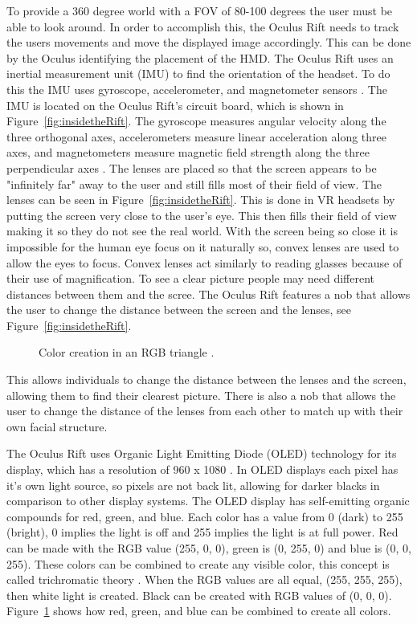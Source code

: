 To provide a 360 degree world with a FOV of 80-100 degrees the user must be able to look around. In order to accomplish this, the Oculus Rift needs to track the users movements and move the displayed image accordingly. This can be done by the Oculus identifying the placement of the HMD. The Oculus Rift uses an inertial measurement unit (IMU) to find the orientation of the headset. To do this the IMU uses gyroscope, accelerometer, and magnetometer sensors \cite{LaValle2017}. The IMU is located on the Oculus Rift's circuit board, which is shown in Figure~\ref{fig:insidetheRift}. The gyroscope measures angular velocity along the three orthogonal axes, accelerometers measure linear acceleration along three axes, and magnetometers measure magnetic field strength along the three perpendicular axes \cite{LaValle2017}. The lenses are placed so that the screen appears to be "infinitely far" away to the user and still fills most of their field of view. The lenses can be seen in Figure~\ref{fig:insidetheRift}. This is done in VR headsets by putting the screen very close to the user's eye. This then fills their field of view making it so they do not see the real world. With the screen being so close it is impossible for the human eye focus on it naturally so, convex lenses are used to allow the eyes to focus. Convex lenses act similarly to reading glasses because of their use of magnification. To see a clear picture people may need different distances between them and the scree. The Oculus Rift features a nob that allows the user to change the distance between the screen and the lenses, see Figure~\ref{fig:insidetheRift}. 
\begin{figure}[!ht]
	\begin{center}
	\end{center}
	\caption{Color creation in an RGB triangle \cite{LaValle2017}.} \label{fig:RGBcolors}
\end{figure} This allows individuals to change the distance between the lenses and the screen, allowing them to find their clearest picture. There is also a nob that allows the user to change the distance of the lenses from each other to match up with their own facial structure. 


The Oculus Rift uses Organic Light Emitting Diode (OLED) technology for its display, which has a resolution of 960 x 1080 \cite{Sharkey2012}. In OLED displays each pixel has it's own light source, so pixels are not back lit, allowing for darker blacks in comparison to other display systems. The OLED display has self-emitting organic compounds for red, green, and blue. Each color has a value from 0 (dark) to 255 (bright), 0 implies the light is off and 255 implies the light is at full power. Red can be made with the RGB value (255, 0, 0), green is (0, 255, 0) and blue is (0, 0, 255). These colors can be combined to create any visible color, this concept is called trichromatic theory \cite{LaValle2017}. When the RGB values are all equal, (255, 255, 255), then white light is created. Black can be created with RGB values of (0, 0, 0). Figure~\ref{fig:RGBcolors} shows how red, green, and blue can be combined to create all colors. 



